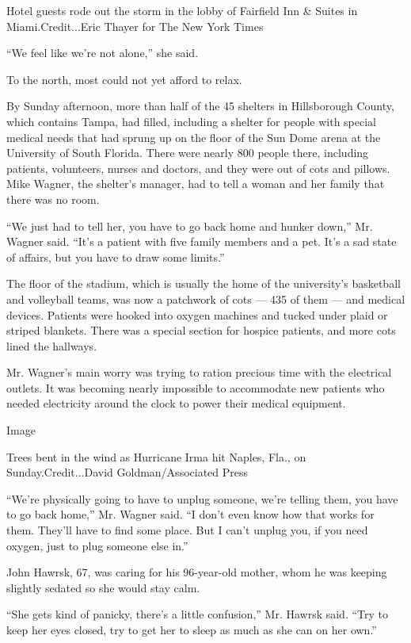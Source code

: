 Hotel guests rode out the storm in the lobby of Fairfield Inn \& Suites
in Miami.Credit...Eric Thayer for The New York Times

``We feel like we're not alone,'' she said.

To the north, most could not yet afford to relax.

By Sunday afternoon, more than half of the 45 shelters in Hillsborough
County, which contains Tampa, had filled, including a shelter for people
with special medical needs that had sprung up on the floor of the Sun
Dome arena at the University of South Florida. There were nearly 800
people there, including patients, volunteers, nurses and doctors, and
they were out of cots and pillows. Mike Wagner, the shelter's manager,
had to tell a woman and her family that there was no room.

``We just had to tell her, you have to go back home and hunker down,''
Mr. Wagner said. ``It's a patient with five family members and a pet.
It's a sad state of affairs, but you have to draw some limits.''

The floor of the stadium, which is usually the home of the university's
basketball and volleyball teams, was now a patchwork of cots --- 435 of
them --- and medical devices. Patients were hooked into oxygen machines
and tucked under plaid or striped blankets. There was a special section
for hospice patients, and more cots lined the hallways.

Mr. Wagner's main worry was trying to ration precious time with the
electrical outlets. It was becoming nearly impossible to accommodate new
patients who needed electricity around the clock to power their medical
equipment.

Image

Trees bent in the wind as Hurricane Irma hit Naples, Fla., on
Sunday.Credit...David Goldman/Associated Press

``We're physically going to have to unplug someone, we're telling them,
you have to go back home,'' Mr. Wagner said. ``I don't even know how
that works for them. They'll have to find some place. But I can't unplug
you, if you need oxygen, just to plug someone else in.''

John Hawrsk, 67, was caring for his 96-year-old mother, whom he was
keeping slightly sedated so she would stay calm.

``She gets kind of panicky, there's a little confusion,'' Mr. Hawrsk
said. ``Try to keep her eyes closed, try to get her to sleep as much as
she can on her own.''

